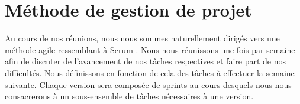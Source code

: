 \section{Méthode de gestion de projet}
	\label{sec:gestion}


Au cours de nos réunions, nous nous sommes naturellement dirigés vers une méthode agile ressemblant à \og Scrum \fg. Nous nous réunissons une fois par semaine afin de discuter de l'avancement de nos tâches respectives et faire part de nos difficultés. Nous définissons en fonction de cela des tâches à effectuer la semaine suivante. 
	Chaque version sera composée de sprints au cours desquels nous nous consacrerons à un sous-ensemble de tâches nécessaires à une version. %
	
